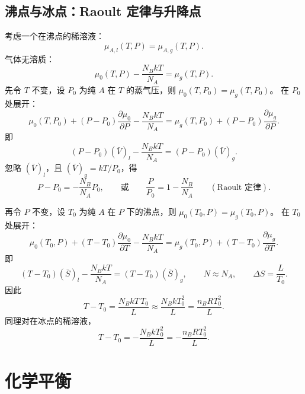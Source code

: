 \subsection{沸点与冰点：Raoult 定律与升降点}
考虑一个在沸点的稀溶液：
\begin{equation}
    \mu_{A,l}(T,P)=\mu_{A,g}(T,P).
\end{equation}
气体无溶质：
\begin{equation}
    \mu_0(T,P)-\frac{N_BkT}{N_A}=\mu_g(T,P).
\end{equation}
先令 $T$ 不变，设 $P_0$ 为纯 $A$ 在 $T$ 的蒸气压，则 $\mu_0(T,P_0)=\mu_g(T,P_0)$。
在 $P_0$ 处展开：
\begin{equation}
    \mu_0(T,P_0)+(P-P_0)\frac{\partial \mu_0}{\partial P}-\frac{N_BkT}{N_A}
    =\mu_g(T,P_0)+(P-P_0)\frac{\partial \mu_g}{\partial P}.
\end{equation}
即
\begin{equation}
    (P-P_0)(\bar V)_l-\frac{N_BkT}{N_A}=(P-P_0)(\bar V)_g.
\end{equation}
忽略 $(\bar V)_l$，且 $(\bar V)_g=kT/P_0$，得
\begin{equation}
    P-P_0=-\frac{N_B}{N_A}P_0,\qquad \text{或}\qquad \frac{P}{P_0}=1-\frac{N_B}{N_A}\qquad (\text{Raoult 定律}).
\end{equation}

再令 $P$ 不变，设 $T_0$ 为纯 $A$ 在 $P$ 下的沸点，则 $\mu_0(T_0,P)=\mu_g(T_0,P)$。
在 $T_0$ 处展开：
\begin{equation}
    \mu_0(T_0,P)+(T-T_0)\frac{\partial \mu_0}{\partial T}-\frac{N_BkT}{N_A}
    =\mu_g(T_0,P)+(T-T_0)\frac{\partial \mu_g}{\partial T}.
\end{equation}
即
\begin{equation}
    (T-T_0)(\bar S)_l-\frac{N_BkT}{N_A}=(T-T_0)(\bar S)_g,
    \qquad N\approx N_A,\qquad \Delta S=\frac{L}{T_0}.
\end{equation}
因此
\begin{equation}
    T-T_0=\frac{N_BkT\,T_0}{L}\approx \frac{N_BkT_0^2}{L}=\frac{n_BRT_0^2}{L}.
\end{equation}
同理对在冰点的稀溶液，
\begin{equation}
    T-T_0=-\frac{N_BkT_0^2}{L}=-\frac{n_BRT_0^2}{L}.
\end{equation}

\section{化学平衡}
